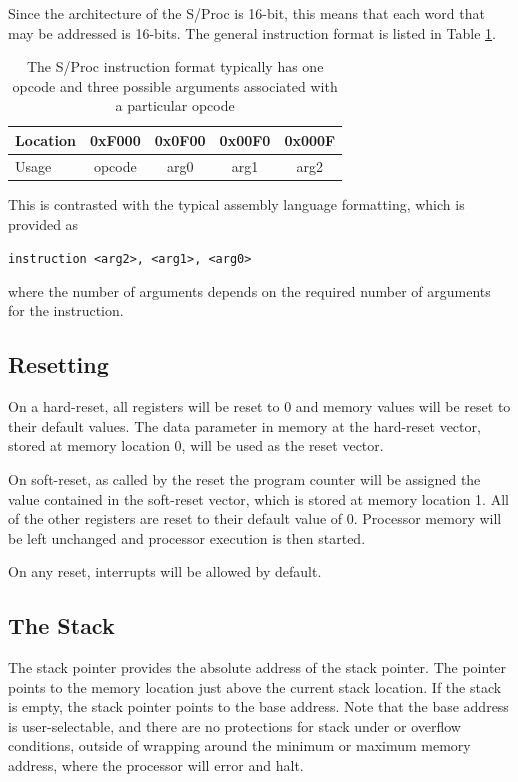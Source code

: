 \documentclass{article}
\begin{document}
Since the architecture of the S/Proc is 16-bit, this means that each word that may be addressed is 16-bits. The general instruction format is listed  in Table \ref{table:instruction-formatting}.

\begin{table}[h!]
    \centering
    \begin{tabular}{l|cccc}
        \hline
        Location & 0xF000 & 0x0F00 & 0x00F0 & 0x000F \\
        \hline
        Usage & opcode & arg0 & arg1 & arg2 \\
        \hline
    \end{tabular}
    \caption{The S/Proc instruction format typically has one opcode and three possible arguments associated with a particular opcode}
    \label{table:instruction-formatting}
\end{table}

This is contrasted with the typical assembly language formatting, which is provided as

\begin{center}
    \texttt{instruction <arg2>, <arg1>, <arg0>}
\end{center}

where the number of arguments depends on the required number of arguments for the instruction.

\subsection{Resetting}

On a hard-reset, all registers will be reset to 0 and memory values will be reset to their default values. The data parameter in memory at the hard-reset vector, stored at memory location 0, will be used as the reset vector.

On soft-reset, as called by the reset the program counter will be assigned the value contained in the soft-reset vector, which is stored at memory location 1. All of the other registers are reset to their default value of 0. Processor memory will be left unchanged and processor execution is then started.

On any reset, interrupts will be allowed by default.

\subsection{The Stack}
\label{sec:the-stack}

The stack pointer provides the absolute address of the stack pointer. The pointer points to the memory location just above the current stack location. If the stack is empty, the stack pointer points to the base address. Note that the base address is user-selectable, and there are no protections for stack under or overflow conditions, outside of wrapping around the minimum or maximum memory address, where the processor will error and halt.
\end{document}
